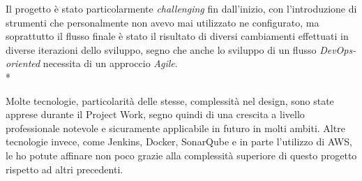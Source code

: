 \documentclass[../main.tex]{subfiles}
\begin{document}
	    Il progetto è stato particolarmente \emph{challenging} fin dall'inizio, con l'introduzione di strumenti che personalmente non avevo mai utilizzato ne configurato, ma soprattutto il flusso finale è stato il risultato di diversi cambiamenti effettuati in diverse iterazioni dello sviluppo, segno che anche lo sviluppo di un flusso \emph{DevOps-oriented} necessita di un approccio \emph{Agile}.\\*
	    
	    Molte tecnologie, particolarità delle stesse, complessità nel design, sono state apprese durante il Project Work, segno quindi di una crescita a livello professionale notevole e sicuramente applicabile in futuro in molti ambiti. Altre tecnologie invece, come Jenkins, Docker, SonarQube e in parte l'utilizzo di AWS, le ho potute affinare non poco grazie alla complessità superiore di questo progetto rispetto ad altri precedenti.
\end{document}
